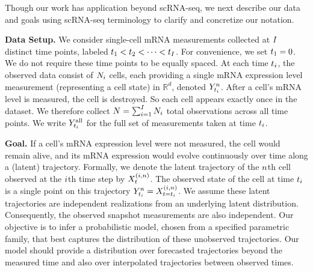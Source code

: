 Though our work has application beyond scRNA-seq, we next describe our data and goals using scRNA-seq terminology to clarify and concretize our notation.

\textbf{Data Setup.}  
We consider single-cell mRNA measurements collected at $I$ distinct time points, labeled $t_{1} < t_{2} < \cdots < t_{I}$. For convenience, we set $t_{1} = 0$. We do not require these time points to be equally spaced. At each time $t_{i}$, the observed data consist of $N_{i}$ cells, each providing a single mRNA expression level measurement (representing a cell state) in $\mathbb{R}^d$, denoted $\obsat{\timestep{\timeidx}}^{\sampleidx}$. After a cell's mRNA level is measured, the cell is destroyed. So each cell appears exactly once in the dataset. We therefore collect $N = \sum_{i=1}^{I} N_{i}$ total observations across all time points. We write $\obsatall{\timestep{\timeidx}}$ for the full set of measurements taken at time $t_{i}$.

\textbf{Goal.} If a cell's mRNA expression level were not measured, the cell would remain alive, and its mRNA expression would evolve continuously over time along a (latent) trajectory. 
Formally, we denote the latent trajectory of the $n$th cell observed at the $i$th time step by $\responseat{\timet}^{(\timeidx, \sampleidx)}$. The observed state of the cell at time $t_{i}$ is a single point on this trajectory $\obsat{\timestep{\timeidx}}^{\sampleidx} = \responseat{\timet = \timestep{\timeidx}}^{ (\timeidx, \sampleidx) }$. We assume these latent trajectories are independent realizations from an underlying latent distribution. 
Consequently, the observed snapshot measurements are also independent.
Our objective is
to infer a probabilistic model, chosen from a specified parametric family, that best captures the distribution of these unobserved trajectories. Our model should provide a distribution over forecasted trajectories beyond the measured time and also over interpolated trajectories between observed times. 


